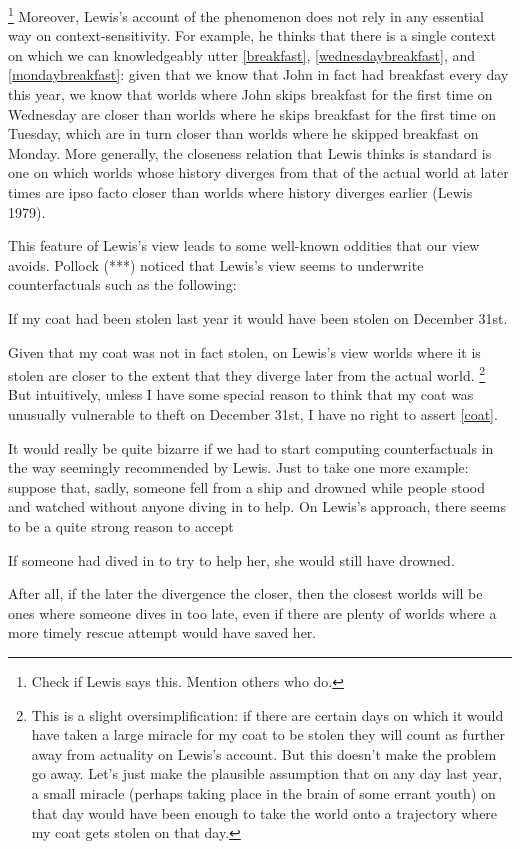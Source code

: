 \documentclass[If.tex]{subfiles}
\begin{document}
\footnote{Check if Lewis says this. Mention others who do.}
 Moreover, Lewis's account of the phenomenon does not rely in any essential way on context-sensitivity. For example, he thinks that there is a single context on which we can knowledgeably utter \ref{breakfast}, \ref{wednesdaybreakfast}, and \ref{mondaybreakfast}: given that we know that John in fact had breakfast every day this year, we know that worlds where John skips breakfast for the first time on Wednesday are closer than worlds where he skips breakfast for the first time on Tuesday, which are in turn closer than worlds where he skipped breakfast on Monday. More generally, the closeness relation that Lewis thinks is standard is one on which worlds whose history diverges from that of the actual world at later times are ipso facto closer than worlds where history diverges earlier (Lewis 1979).

This feature of Lewis's view leads to some well-known oddities that our view avoids. Pollock (***) noticed that Lewis's view seems to underwrite counterfactuals such as the following:
\begin{prop}
	\nitem \label{coat}
		If my coat had been stolen last year it would have been stolen on December 31st.
\end{prop}
Given that my coat was not in fact stolen, on Lewis's view worlds where it is stolen are closer to the extent that they diverge later from the actual world.%
\footnote{This is a slight oversimplification: if there are certain days on which it would have taken a large miracle for my coat to be stolen they will count as further away from actuality on Lewis's account. But this doesn't make the problem go away. Let's just make the plausible assumption that on any day last year, a small miracle (perhaps taking place in the brain of some errant youth) on that day would have been enough to take the world onto a trajectory where my coat gets stolen on that day.}
 But intuitively, unless I have some special reason to think that my coat was unusually vulnerable to theft on December 31st, I have no right to assert \ref{coat}.

It would really be quite bizarre if we had to start computing counterfactuals in the way seemingly recommended by Lewis. Just to take one more example: suppose that, sadly, someone fell from a ship and drowned while people stood and watched without anyone diving in to help. On Lewis's approach, there seems to be a quite strong reason to accept
\begin{prop}
	\nitem \label{drowning}
		If someone had dived in to try to help her, she would still have drowned.
\end{prop}
After all, if the later the divergence the closer, then the closest worlds will be ones where someone dives in too late, even if there are plenty of worlds where a more timely rescue attempt would have saved her.
\end{document}
